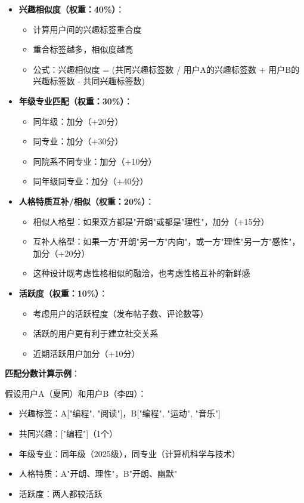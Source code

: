 \documentclass[12pt,a4paper]{article}
\begin{document}
\begin{itemize}
    \item \textbf{兴趣相似度（权重：40\%）}：
        \begin{itemize}
            \item 计算用户间的兴趣标签重合度
            \item 重合标签越多，相似度越高
            \item 公式：兴趣相似度 = (共同兴趣标签数 / 用户A的兴趣标签数 + 用户B的兴趣标签数 - 共同兴趣标签数)
        \end{itemize}
    
    \item \textbf{年级专业匹配（权重：30\%）}：
        \begin{itemize}
            \item 同年级：加分（+20分）
            \item 同专业：加分（+30分）
            \item 同院系不同专业：加分（+10分）
            \item 同年级同专业：加分（+40分）
        \end{itemize}
    
    \item \textbf{人格特质互补/相似（权重：20\%）}：
        \begin{itemize}
            \item 相似人格型：如果双方都是"开朗"或都是"理性"，加分（+15分）
            \item 互补人格型：如果一方"开朗"另一方"内向"，或一方"理性"另一方"感性"，加分（+20分）
            \item 这种设计既考虑性格相似的融洽，也考虑性格互补的新鲜感
        \end{itemize}
    
    \item \textbf{活跃度（权重：10\%）}：
        \begin{itemize}
            \item 考虑用户的活跃程度（发布帖子数、评论数等）
            \item 活跃的用户更有利于建立社交关系
            \item 近期活跃用户加分（+10分）
        \end{itemize}
\end{itemize}

\textbf{匹配分数计算示例}：

假设用户A（夏同）和用户B（李四）：
\begin{itemize}
    \item 兴趣标签：A["编程", "阅读"]，B["编程", "运动", "音乐"]
    \item 共同兴趣：["编程"]（1个）
    \item 年级专业：同年级（2025级），同专业（计算机科学与技术）
    \item 人格特质：A"开朗、理性"，B"开朗、幽默"
    \item 活跃度：两人都较活跃
\end{itemize}
\end{document}
